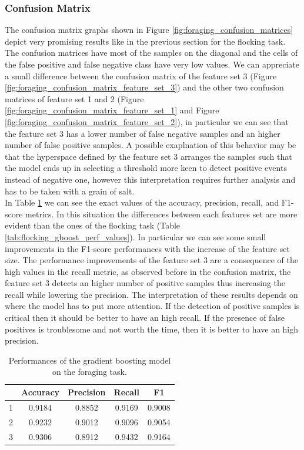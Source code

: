 \documentclass[../../Thesis.tex]{subfiles}
\begin{document}
			\subsubsection{Confusion Matrix}
				The confusion matrix graphs shown in Figure \ref{fig:foraging_confusion_matrices} depict very promising results like in the previous section for the flocking task. The confusion matrices have most of the samples on the diagonal and the cells of the false positive and false negative class have very low values. We can appreciate a small difference between the confusion matrix of the feature set 3 (Figure \ref{fig:foraging_confusion_matrix_feature_set_3}) and the other two confusion matrices of feature set 1 and 2 (Figure \ref{fig:foraging_confusion_matrix_feature_set_1} and Figure \ref{fig:foraging_confusion_matrix_feature_set_2}), in particular we can see that the feature set 3 has a lower number of false negative samples and an higher number of false positive samples. A possible exaplnation of this behavior may be that the hyperspace defined by the feature set 3 arranges the samples such that the model ends up in selecting a threshold more keen to detect positive events instead of negative one, however this interpretation requires further analysis and has to be taken with a grain of salt. \\
				In Table \ref{tab:foraging_gboost_perf_values} we can see the exact values of the accuracy, precision, recall, and F1-score metrics. In this situation the differences between each features set are more evident than the ones of the flocking task (Table \ref{tab:flocking_gboost_perf_values}). In particular we can see some small improvements in the F1-score performances with the increase of the feature set size. The performance improvements of the feature set 3 are a consequence of the high values in the recall metric, as observed before in the confusion matrix, the feature set 3 detects an higher number of positive samples thus increasing the recall while lowering the precision. The interpretation of these results depends on where the model has to put more attention. If the detection of positive samples is critical then it should be better to have an high recall. If the presence of false positives is troublesome and not worth the time, then it is better to have an high precision.
				\begin{table}
					\center
					\setlength\tabcolsep{0.5em}
					\begin{tabular}{|ccccc|}
						\hline
						\rowcolor{bluepoli!40}
						\multicolumn{1}{|c}{\textbf{Feature Set}} &  \textbf{Accuracy} & \textbf{Precision} & \textbf{Recall} & \textbf{F1}\\ 
						\hline
						1 & 0.9184 & 0.8852 & 0.9169 & 0.9008 \\
						\hline
						2 & 0.9232 & 0.9012 & 0.9096 & 0.9054 \\
						\hline
						3 & 0.9306 & 0.8912 & 0.9432 & 0.9164 \\
						\hline
					\end{tabular}
					\caption{Performances of the gradient boosting model on the foraging task.}
					\label{tab:foraging_gboost_perf_values}
				\end{table}
\end{document}
